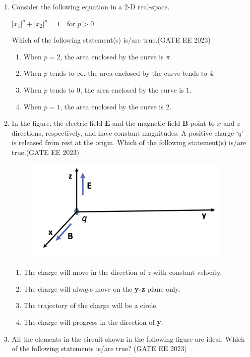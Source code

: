 \documentclass[a4paper,12pt]{exam}
\theoremstyle{remark}
\begin{document}
\begin{enumerate}
\begin{multicols}{2}
\begin{enumerate}
    \item Bus 1\quad $P-|V|$ bus\\
Bus 2\quad $P-Q$ bus\\
Bus 3\quad Slack bus

\end{enumerate}
\end{multicols}

\item Consider the following equation in a 2-D real-space.

$
|x_1|^p + |x_2|^p = 1 \quad \text{for } p > 0
$

Which of the following statement(s) is/are true.\hfill{(GATE EE 2023)}
\begin{enumerate}
    \item When $p=2$, the area enclosed by the curve is $\pi$.
    \item When $p$ tends to $\infty$, the area enclosed by the curve tends to $4$.
    \item When $p$ tends to $0$, the area enclosed by the curve is $1$.
    \item When $p=1$, the area enclosed by the curve is $2$.
\end{enumerate}
\newpage

\item
In the figure, the electric field $\textbf{E}$ and the magnetic field $\textbf{B}$ point to $x$ and $z$ directions, respectively, and have constant magnitudes. A positive charge `$q$' is released from rest at the origin. Which of the following statement(s) is/are true.\hfill{(GATE EE 2023)}

\begin{figure}[H]
    \centering
    \includegraphics[width=0.5\columnwidth]{figs/Q 43.png}
    \caption{}
    \label{fig:placeholder}
\end{figure}
\begin{enumerate}
    \item The charge will move in the direction of $z$ with constant velocity.
    \item The charge will always move on the \textbf{y-z} plane only.
    \item The trajectory of the charge will be a circle.
    \item The charge will progress in the direction of \textbf{y}.
\end{enumerate}
\item All the elements in the circuit shown in the following figure are ideal. Which of the following statements is/are true? \hfill{(GATE EE 2023)}


\end{enumerate}
\end{document}
